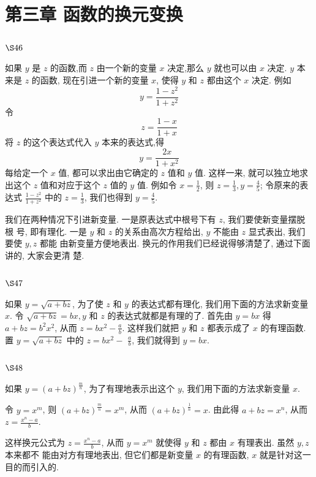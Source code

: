 \chapter{第三章 函数的换元变换}

\section{$\S 46$}

如果 $y$ 是 $z$ 的函数,而 $z$ 由一个新的变量 $x$ 决定,那么 $y$ 就也可以由 $x$ 决定. $y$ 本来是 $z$ 的函数, 现在引进一个新的变量 $x$, 使得 $y$ 和 $z$ 都由这个 $x$ 决定. 例如
\[
y=\frac{1-z^{2}}{1+z^{2}}
\]
令
\[
z=\frac{1-x}{1+x}
\]
将 $z$ 的这个表达式代入 $y$ 本来的表达式,得
\[
y=\frac{2 x}{1+x^{2}}
\]
每给定一个 $x$ 值, 都可以求出由它确定的 $z$ 值和 $y$ 值. 这样一来, 就可以独立地求出这个 $z$ 值和对应于这个 $z$ 值的 $y$ 值. 例如令 $x=\frac{1}{2}$, 则 $z=\frac{1}{3}, y=\frac{4}{5}$; 令原来的表达式 $\frac{1-z^{2}}{1+z^{2}}$ 中的 $z=\frac{1}{3}$, 我们也得到 $y=\frac{4}{5}$.

我们在两种情况下引进新变量. 一是原表达式中根号下有 $z$, 我们要使新变量摆脱根 号, 即有理化. 一是 $y$ 和 $z$ 的关系由高次方程给出, $y$ 不能由 $z$ 显式表出, 我们要使 $y, z$ 都能 由新变量方便地表出. 换元的作用我们已经说得够清楚了, 通过下面讲的, 大家会更清 楚.

\section{$\S 47$}

如果 $y=\sqrt{a+b z}$, 为了使 $z$ 和 $y$ 的表达式都有理化, 我们用下面的方法求新变量 $x$. 令 $\sqrt{a+b z}=b x, y$ 和 $z$ 的表达式就都是有理的了. 首先由 $y=b x$ 得 $a+b z=b^{2} x^{2}$, 从而 $z=b x^{2}-\frac{a}{b}$. 这样我们就把 $y$ 和 $z$ 都表示成了 $x$ 的有理函数. 置 $y=\sqrt{a+b z}$ 中的 $z=b x^{2}-$ $\frac{a}{b}$, 我们就得到 $y=b x$.

\section{$\S 48$}

如果 $y=(a+b z)^{\frac{m}{n}}$, 为了有理地表示出这个 $y$, 我们用下面的方法求新变量 $x$.

令 $y=x^{m}$, 则 $(a+b z)^{\frac{m}{n}}=x^{m}$, 从而 $(a+b z)^{\frac{1}{n}}=x$. 由此得 $a+b z=x^{n}$, 从而 $z=\frac{x^{n}-a}{b}$.

这样换元公式为 $z=\frac{x^{n}-a}{b}$, 从而 $y=x^{m}$ 就使得 $y$ 和 $z$ 都由 $x$ 有理表出. 虽然 $y, z$ 本来都不 能由对方有理地表出, 但它们都是新变量 $x$ 的有理函数, $x$ 就是针对这一目的而引入的.


